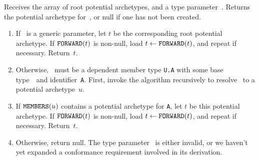 \documentclass[../generics]{subfiles}
\begin{document}
\begin{algorithm}\label{archetype builder lookup} Receives the array of root potential archetypes, and a type parameter~\tT. Returns the potential archetype for~\tT, or null if one has not been created.
\begin{enumerate}
\item If \tT\ is a generic parameter, let $t$ be the corresponding root potential archetype. If $\texttt{FORWARD}(t)$ is non-null, load $t\leftarrow\texttt{FORWARD}(t)$, and repeat if necessary. Return~$t$.
\item Otherwise, \tT\ must be a dependent member type \texttt{U.A} with some base type~\tT\ and identifier~\texttt{A}. First, invoke the algorithm recursively to resolve \tU\ to a potential archetype~$u$.
\item If $\texttt{MEMBERS}(u)$ contains a potential archetype for \texttt{A}, let $t$ be this potential archetype. If $\texttt{FORWARD}(t)$ is non-null, load $t\leftarrow\texttt{FORWARD}(t)$, and repeat if necessary. Return~$t$.
\item Otherwise, return null. The type parameter \tT\ is either invalid, or we haven't yet expanded a conformance requirement involved in its derivation.
\end{enumerate}
\end{algorithm}
\end{document}
